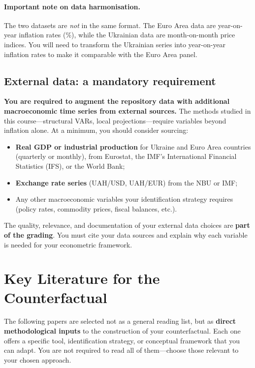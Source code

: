 \documentclass[11pt,a4paper]{article}
\begin{document}
\paragraph{Important note on data harmonisation.}
The two datasets are \emph{not} in the same format. The Euro Area data are
year-on-year inflation rates (\%), while the Ukrainian data are month-on-month
price indices. You will need to transform the Ukrainian series into year-on-year
inflation rates to make it comparable with the Euro Area panel.

\subsection*{External data: a mandatory requirement}

\textbf{You are required to augment the repository data with additional
macroeconomic time series from external sources.} The methods studied in this
course---structural VARs, local projections---require variables beyond inflation
alone. At a minimum, you should consider sourcing:

\begin{itemize}[leftmargin=2em]
  \item \textbf{Real GDP or industrial production} for Ukraine and Euro Area
    countries (quarterly or monthly), from Eurostat, the IMF's International
    Financial Statistics (IFS), or the World Bank;
  \item \textbf{Exchange rate series} (UAH/USD, UAH/EUR) from the NBU or IMF;
  \item Any other macroeconomic variables your identification strategy requires
    (policy rates, commodity prices, fiscal balances, etc.).
\end{itemize}

The quality, relevance, and documentation of your external data choices are
\textbf{part of the grading}. You must cite your data sources and explain why
each variable is needed for your econometric framework.


\section*{Key Literature for the Counterfactual}

The following papers are selected not as a general reading list, but as
\textbf{direct methodological inputs} to the construction of your
counterfactual. Each one offers a specific tool, identification strategy, or
conceptual framework that you can adapt. You are not required to read all of
them---choose those relevant to your chosen approach.
\end{document}
